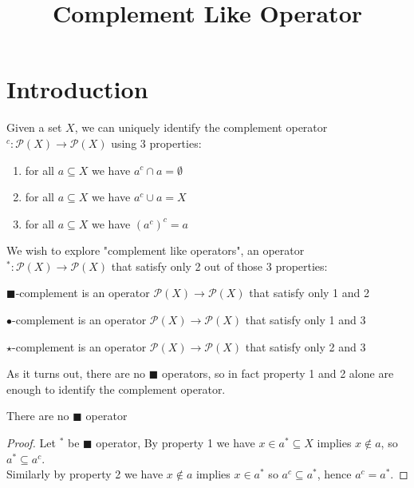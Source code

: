 

\newcommand{\clf}[2]{\mbox{clf}_{#2}\left(#1\right)}
\newcommand{\ICI}[1]{\mathcal{ICI}\left(#1\right)}
\title{Complement Like Operator}

	
	\maketitle
	\section{Introduction}
	Given a set $X$, we can uniquely identify the complement operator $^c:\mathcal{P}(X)\to\mathcal{P}(X)$ using 3 properties:
	\begin{enumerate}
		\item{ for all $a\subseteq X$ we have $a^c\cap a=\emptyset$}
		\item{ for all $a\subseteq X$ we have $a^c\cup a=X$}
		\item{ for all $a\subseteq X$ we have $(a^c)^c=a$}
	\end{enumerate}
	We wish to explore "complement like operators", an operator $^*:\mathcal{P}(X)\to\mathcal{P}(X)$ that satisfy only 2 out of those 3 properties:
	
	
	\begin{definition}
		$\blacksquare$-complement is an operator $\mathcal{P}(X)\to\mathcal{P}(X)$ that satisfy only 1 and 2
	\end{definition}
	\begin{definition}
		$\bullet$-complement is an operator $\mathcal{P}(X)\to\mathcal{P}(X)$ that satisfy only 1 and 3
	\end{definition}
	\begin{definition}
		$\star$-complement is an operator $\mathcal{P}(X)\to\mathcal{P}(X)$ that satisfy only 2 and 3
	\end{definition}
	
	As it turns out, there are no $\blacksquare$ operators, so in fact property 1 and 2 alone are enough to identify the complement operator.
	\begin{lemma}\label{lem:1.4}
		There are no $\blacksquare$ operator
	\end{lemma}
	\begin{proof}
		Let $^*$ be $\blacksquare$ operator, By property 1 we have $x\in a^*\subseteq X$ implies $x\notin a$, so $a^*\subseteq a^c$.\\
		Similarly by property 2 we have $x\notin a$ implies $x\in a^*$ so $a^c\subseteq a^*$, hence $a^c=a^*$.
	\end{proof}
	
